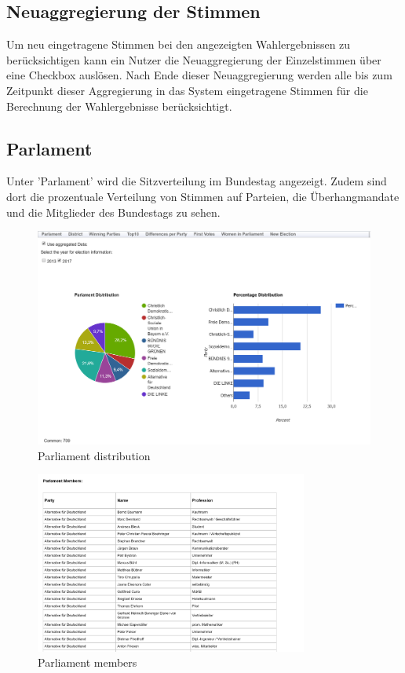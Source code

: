 \documentclass[a4paper]{scrreprt}
\begin{document}
\subsection{Neuaggregierung der Stimmen}

Um neu eingetragene Stimmen bei den angezeigten Wahlergebnissen zu berücksichtigen kann ein Nutzer die Neuaggregierung der Einzelstimmen über eine Checkbox auslösen. Nach Ende dieser Neuaggregierung werden alle bis zum Zeitpunkt dieser Aggregierung in das System eingetragene Stimmen für die Berechnung der Wahlergebnisse berücksichtigt.


\subsection{Parlament}

Unter 'Parlament' wird die Sitzverteilung im Bundestag angezeigt. Zudem sind dort die prozentuale Verteilung von Stimmen auf Parteien,  die Überhangmandate und die Mitglieder des Bundestags zu sehen. 

\begin{figure}[H]
\centering
\includegraphics[width=\textwidth]{images/parliament_distribution.png}
\caption {Parliament distribution}
\end{figure}

\begin{figure}[H]
\centering
\includegraphics[width=0.8\textwidth]{images/parliament_members.png}
\caption {Parliament members}
\end{figure}
\end{document}
